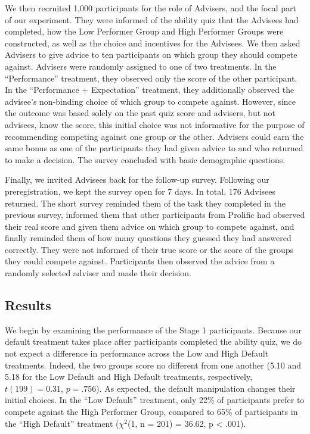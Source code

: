 \documentclass[
  man,
  floatsintext,
  longtable,
  nolmodern,
  notxfonts,
  notimes,
  colorlinks=true,linkcolor=blue,citecolor=blue,urlcolor=blue]{apa7}
\begin{document}
We then recruited 1,000 participants for the role of Advisers, and the
focal part of our experiment. They were informed of the ability quiz
that the Advisees had completed, how the Low Performer Group and High
Performer Groups were constructed, as well as the choice and incentives
for the Advisees. We then asked Advisers to give advice to ten
participants on which group they should compete against. Advisers were
randomly assigned to one of two treatments. In the ``Performance''
treatment, they observed only the score of the other participant. In the
``Performance + Expectation'' treatment, they additionally observed the
advisee's non-binding choice of which group to compete against. However,
since the outcome was based solely on the past quiz score and advisers,
but not advisees, know the score, this initial choice was not
informative for the purpose of recommending competing against one group
or the other. Advisers could earn the same bonus as one of the
participants they had given advice to and who returned to make a
decision. The survey concluded with basic demographic questions.

Finally, we invited Advisees back for the follow-up survey. Following
our preregistration, we kept the survey open for 7 days. In total, 176
Advisees returned. The short survey reminded them of the task they
completed in the previous survey, informed them that other participants
from Prolific had observed their real score and given them advice on
which group to compete against, and finally reminded them of how many
questions they guessed they had answered correctly. They were not
informed of their true score or the score of the groups they could
compete against. Participants then observed the advice from a randomly
selected adviser and made their decision.

\subsection{Results}\label{results}

We begin by examining the performance of the Stage 1 participants.
Because our default treatment takes place after participants completed
the ability quiz, we do not expect a difference in performance across
the Low and High Default treatments. Indeed, the two groups score no
different from one another (5.10 and 5.18 for the Low Default and High
Default treatments, respectively, \(t(199) = 0.31\), \(p = .756\)). As
expected, the default manipulation changes their initial choices. In the
``Low Default'' treatment, only 22\% of participants prefer to compete
against the High Performer Group, compared to 65\% of participants in
the ``High Default'' treatment (\(\chi^2\)(1, n = 201) = 36.62, p
\textless{} .001).
\end{document}
